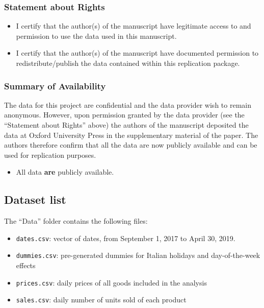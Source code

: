 \documentclass[
]{article}
\providecommand{\tightlist}{%
  \setlength{\itemsep}{0pt}\setlength{\parskip}{0pt}}
\newcommand{\cmark}{\ding{51}}
\newcommand{\done}{\rlap{$\square$}{\raisebox{2pt}{\large\hspace{1pt}\cmark}}}
\begin{document}
\hypertarget{statement-about-rights}{%
\subsubsection{Statement about Rights}\label{statement-about-rights}}

\begin{itemize}
\tightlist
\item[\done]
  I certify that the author(s) of the manuscript have legitimate access
  to and permission to use the data used in this manuscript.
\item[\done]
  I certify that the author(s) of the manuscript have documented
  permission to redistribute/publish the data contained within this
  replication package. 
\end{itemize}

\hypertarget{summary-of-availability}{%
\subsubsection{Summary of Availability}\label{summary-of-availability}}

The data for this project are confidential and the data provider wish to remain anonymous. However, upon permission granted by the data provider (see the ``Statement about Rights'' above) the authors of the manuscript deposited the data at Oxford University Press in the supplementary material of the paper. The authors therefore confirm that all the data are now publicly available and can be used for replication purposes. 

\begin{itemize}
\tightlist
\item[\done]
  All data \textbf{are} publicly available.
\end{itemize}

\hypertarget{dataset-list}{%
\subsection{Dataset list}\label{dataset-list}}

The ``Data'' folder contains the following files:

\begin{itemize}
\item \texttt{dates.csv}: vector of dates, from September 1, 2017 to April 30, 2019.
\item \texttt{dummies.csv}: pre-generated dummies for Italian holidays and day-of-the-week effects
\item \texttt{prices.csv}: daily prices of all goods included in the analysis
\item \texttt{sales.csv}: daily number of units sold of each product
\end{itemize}
\end{document}
